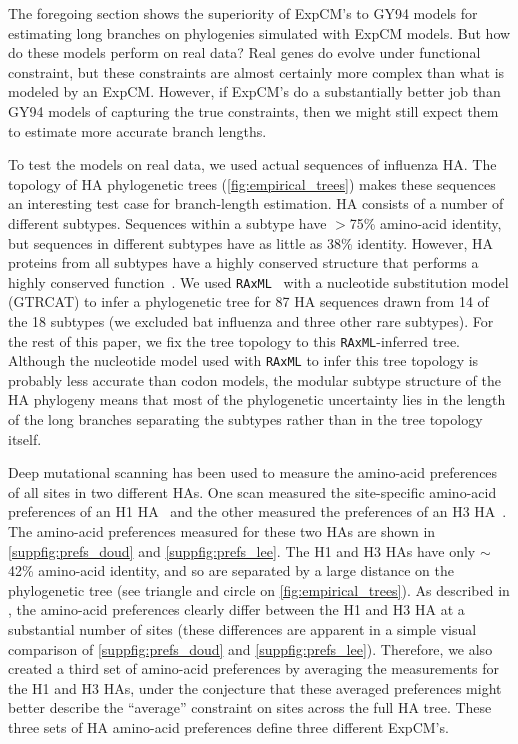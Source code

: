 \documentclass[11pt]{article}
\begin{document}
The foregoing section shows the superiority of ExpCM's to GY94 models for estimating long branches on phylogenies simulated with ExpCM models.
But how do these models perform on real data?
Real genes do evolve under functional constraint, but these constraints are almost certainly more complex than what is modeled by an ExpCM.
However, if ExpCM's do a substantially better job than GY94 models of capturing the true constraints, then we might still expect them to estimate more accurate branch lengths.

To test the models on real data, we used actual sequences of influenza HA. 
The topology of HA phylogenetic trees (\ref{fig:empirical_trees}) makes these sequences an interesting test case for branch-length estimation.
HA consists of a number of different subtypes.
Sequences within a subtype have $>$75\% amino-acid identity, but sequences in different subtypes have as little as 38\% identity.
However, HA proteins from all subtypes have a highly conserved structure that performs a highly conserved function~\citep{ha2002h5,russell2004h1}.
We used \texttt{RAxML}~\citep{stamatakis2006raxml} with a nucleotide substitution model  (GTRCAT) to infer a phylogenetic tree for 87 HA sequences drawn from 14 of the 18 subtypes (we excluded bat influenza and three other rare subtypes).
For the rest of this paper, we fix the tree topology to this \texttt{RAxML}-inferred tree.
Although the nucleotide model used with \texttt{RAxML} to infer this tree topology is probably less accurate than codon models, the modular subtype structure of the HA phylogeny means that most of the phylogenetic uncertainty lies in the length of the long branches separating the subtypes rather than in the tree topology itself.

Deep mutational scanning has been used to measure the amino-acid preferences of all sites in two different HAs.
One scan measured the site-specific amino-acid preferences of an H1 HA~\citep{doud2016accurate} and the other measured the preferences of an H3 HA~\citep{lee2018deep}.
The amino-acid preferences measured for these two HAs are shown in \ref{suppfig:prefs_doud} and 
\ref{suppfig:prefs_lee}.
The H1 and H3 HAs have only $\sim$42\% amino-acid identity, and so are separated by a large distance on the phylogenetic tree (see triangle and circle on \ref{fig:empirical_trees}).
As described in \citet{lee2018deep}, the amino-acid preferences clearly differ between the H1 and H3 HA at a substantial number of sites (these differences are apparent in a simple visual comparison of \ref{suppfig:prefs_doud} and 
\ref{suppfig:prefs_lee}).
Therefore, we also created a third set of amino-acid preferences by averaging the measurements for the H1 and H3 HAs, under the conjecture that these averaged preferences might better describe the ``average'' constraint on sites across the full HA tree.
These three sets of HA amino-acid preferences define three different ExpCM's.
  
\end{document}
